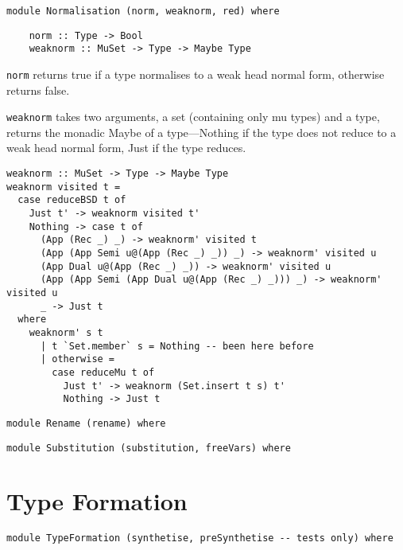 \begin{lstlisting}
module Normalisation (norm, weaknorm, red) where
\end{lstlisting}

\begin{lstlisting}
    norm :: Type -> Bool
    weaknorm :: MuSet -> Type -> Maybe Type
\end{lstlisting}

\lstinline{norm} returns true if a type normalises to a weak head normal form, otherwise returns false.

\lstinline{weaknorm} takes two arguments, a set (containing only mu types) and a type, returns the monadic Maybe of a type---Nothing if the type does not reduce to a weak head normal form, Just if the type reduces.

\begin{lstlisting}
weaknorm :: MuSet -> Type -> Maybe Type
weaknorm visited t = 
  case reduceBSD t of
    Just t' -> weaknorm visited t'
    Nothing -> case t of
      (App (Rec _) _) -> weaknorm' visited t
      (App (App Semi u@(App (Rec _) _)) _) -> weaknorm' visited u
      (App Dual u@(App (Rec _) _)) -> weaknorm' visited u
      (App (App Semi (App Dual u@(App (Rec _) _))) _) -> weaknorm' visited u
      _ -> Just t
  where
    weaknorm' s t
      | t `Set.member` s = Nothing -- been here before
      | otherwise = 
        case reduceMu t of
          Just t' -> weaknorm (Set.insert t s) t'
          Nothing -> Just t
\end{lstlisting}

\begin{lstlisting}
module Rename (rename) where
\end{lstlisting}

\begin{lstlisting}
module Substitution (substitution, freeVars) where

\end{lstlisting}
\section{Type Formation}

\begin{lstlisting}
module TypeFormation (synthetise, preSynthetise -- tests only) where

\end{lstlisting}


